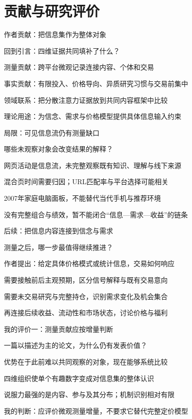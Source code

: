 \documentclass[11pt,compress]{beamer}
\begin{document}
\section{贡献与研究评价}
\begin{frame}{作者贡献：把信息集作为整体对象}\relax
{\small\color{tsinghua}回到引言：四维证据共同填补了什么？\par}\medskip
测量贡献：跨平台微观记录连接内容、个体和交易\par\medskip
事实贡献：有限投入、价格导向、异质研究习惯与交易前集中\par\medskip
领域联系：把分散注意力证据放到共同内容框架中比较\par\medskip
理论用途：为信念、需求与价格模型提供具体信息输入约束\par\medskip
{}
\end{frame}
\begin{frame}{局限：可见信息流仍有测量缺口}\relax
{\small\color{tsinghua}哪些未观察对象会改变结果的解释？\par}\medskip
网页活动是信息流，未完整观察既有知识、理解与线下来源\par\medskip
混合页时间需要归因；URL匹配率与平台选择可能相关\par\medskip
2007年家庭电脑面板，不能替代当代手机与推荐环境\par\medskip
没有完整组合与绩效，暂不能闭合“信息—需求—收益”的链条\par\medskip
{}
\end{frame}
\begin{frame}{后续：把信息内容连接到信念与需求}\relax
{\small\color{tsinghua}测量之后，哪一步最值得继续推进？\par}\medskip
作者提出：给定具体价格模式或统计信息，交易如何响应\par\medskip
需要接触前后主观预期，区分信号解释与既有交易意向\par\medskip
需要未交易研究与完整持仓，识别需求变化及机会集合\par\medskip
再连接后续收益、流动性和市场状态，讨论价格与福利\par\medskip
{}
\end{frame}
\begin{frame}{我的评价一：测量贡献应按增量判断}\relax
{\small\color{tsinghua}一篇以描述为主的论文，为什么仍有发表价值？\par}\medskip
优势在于此前难以共同观察的对象，现在能够系统比较\par\medskip
四维组织使单个有趣数字变成对信息集的整体认识\par\medskip
说服力最强的是内容、参与及其分布；机制识别相对有限\par\medskip
我的判断：应评价微观测量增量，不要求它替代完整定价模型\par\medskip
{}
\end{frame}
\end{document}
